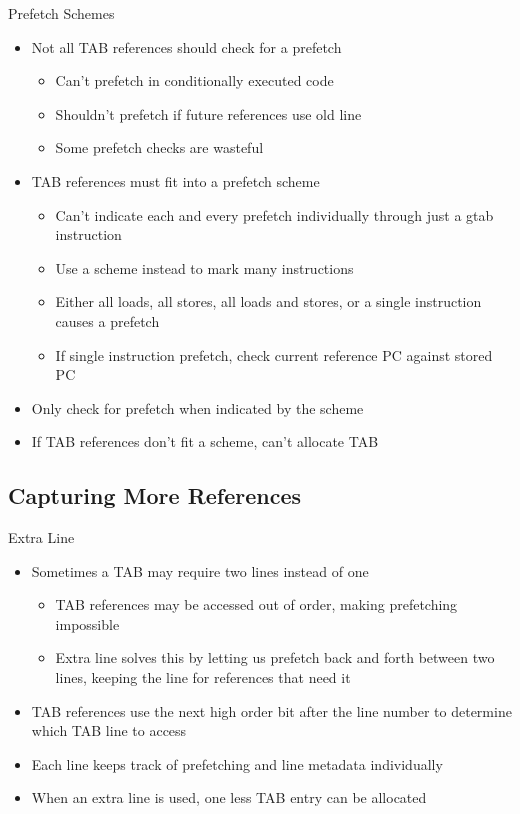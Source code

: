 \documentclass{beamer}
\begin{document}
\begin{frame}{Prefetch Schemes}
   \begin{itemize}
      \item Not all TAB references should check for a prefetch
         \begin{itemize}
            \item Can't prefetch in conditionally executed code
            \item Shouldn't prefetch if future references use old line
            \item Some prefetch checks are wasteful
         \end{itemize}
      \item TAB references must fit into a prefetch scheme
         \begin{itemize}
            \item Can't indicate each and every prefetch individually through 
               just a gtab instruction
            \item Use a scheme instead to mark many instructions
            \item Either all loads, all stores, all loads and stores, or a single
               instruction causes a prefetch
            \item If single instruction prefetch, check current reference PC against
               stored PC
         \end{itemize}
      \item Only check for prefetch when indicated by the scheme
      \item If TAB references don't fit a scheme, can't allocate TAB
   \end{itemize}
\end{frame}
\subsection{Capturing More References}
\begin{frame}{Extra Line}
   \begin{itemize}
      \item Sometimes a TAB may require two lines instead of one
         \begin{itemize}
            \item TAB references may be accessed out of order, making 
               prefetching impossible
            \item Extra line solves this by letting us prefetch back and forth
               between two lines, keeping the line for references that need it
         \end{itemize}
      \item TAB references use the next high order bit after the line number
         to determine which TAB line to access
      \item Each line keeps track of prefetching and line metadata individually
      \item When an extra line is used, one less TAB entry can be allocated
   \end{itemize}
\end{frame}
\end{document}
